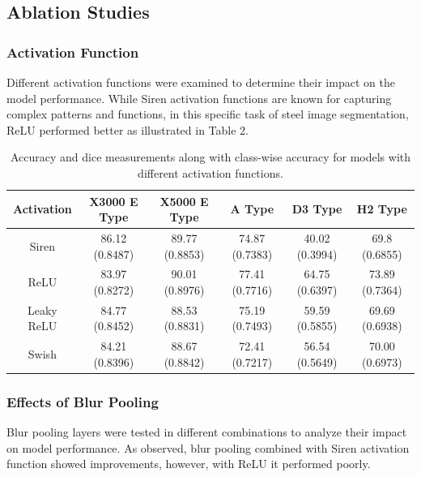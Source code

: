 \documentclass[]{article}
\begin{document}
\subsection{Ablation Studies}

\subsubsection{Activation Function}
Different activation functions were examined to determine their impact on the model performance. While Siren activation functions are known for capturing complex patterns and functions, in this specific task of steel image segmentation, ReLU performed better as illustrated in Table 2.

\begin{table}[h!]
	\centering
	\begin{tabular}{|c|c|c|c|c|c|}
		\hline
		Activation & X3000 E Type & X5000 E Type & A Type & D3 Type & H2 Type \\
		\hline
		Siren & 86.12 (0.8487) & 89.77 (0.8853) & 74.87 (0.7383) & 40.02 (0.3994) & 69.8 (0.6855) \\
		\rowcolor{yellow!30} ReLU & 83.97 (0.8272) & 90.01 (0.8976) & 77.41 (0.7716) & 64.75 (0.6397) & 73.89 (0.7364) \\
		Leaky ReLU & 84.77 (0.8452) & 88.53 (0.8831) & 75.19 (0.7493) & 59.59 (0.5855) & 69.69 (0.6938) \\
		Swish & 84.21 (0.8396) & 88.67 (0.8842) & 72.41 (0.7217) & 56.54 (0.5649) & 70.00 (0.6973) \\
		\hline
	\end{tabular}
	\caption{Accuracy and dice measurements along with class-wise accuracy for models with different activation functions.}
\end{table}

\subsubsection{Effects of Blur Pooling}
Blur pooling layers were tested in different combinations to analyze their impact on model performance. As observed, blur pooling combined with Siren activation function showed improvements, however, with ReLU it performed poorly.
\end{document}
